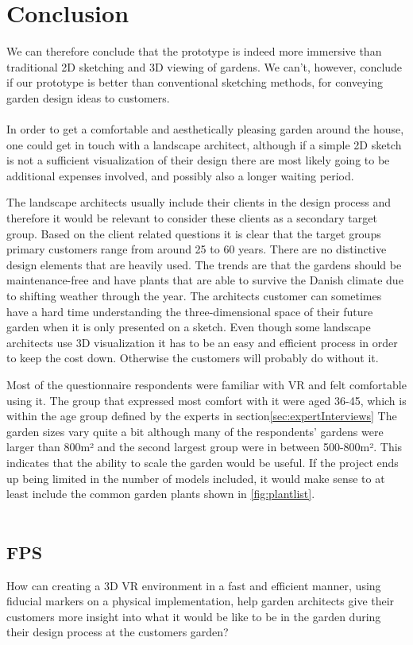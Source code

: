 \chapter{Conclusion}
We can therefore conclude that the prototype is indeed more immersive than traditional 2D sketching and 3D viewing of gardens. We can't, however, conclude if our prototype is better than conventional sketching methods, for conveying garden design ideas to customers.\\\\


In order to get a comfortable and aesthetically pleasing garden around the house, one could get in touch with a landscape architect, although if a simple 2D sketch is not a sufficient visualization of their design there are most likely going to be additional expenses involved, and possibly also a longer waiting period.

The landscape architects usually include their clients in the design process and therefore it would be relevant to consider these clients as a secondary target group. Based on the client related questions it is clear that the target groups primary customers range from around 25 to 60 years. There are no distinctive design elements that are heavily used. The trends are that the gardens should be maintenance-free and have plants that are able to survive the Danish climate due to shifting weather through the year. The architects customer can sometimes have a hard time understanding the three-dimensional space of their future garden when it is only presented on a sketch. Even though some landscape architects use 3D visualization it has to be an easy and efficient process in order to keep the cost down. Otherwise the customers will probably do without it.

Most of the questionnaire respondents were familiar with VR and felt comfortable using it. The group that expressed most comfort with it were aged 36-45, which is within the age group defined by the experts in section\autoref{sec:expertInterviews}
The garden sizes vary quite a bit although many of the respondents' gardens were larger than 800m² and the second largest group were in between 500-800m². This indicates that the ability to scale the garden would be useful. If the project ends up being limited in the number of models included, it would make sense to at least include the common garden plants shown in \autoref{fig:plantlist}.\\\\
\section*{FPS}
How can creating a 3D VR environment in a fast and efficient manner, using fiducial markers on a physical implementation, help garden architects give their customers more insight into what it would be like to be in the garden during their design process at the customers garden?


